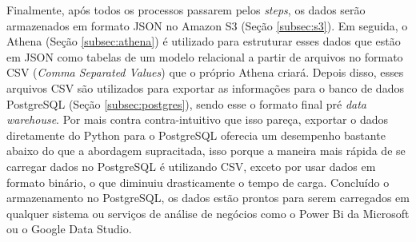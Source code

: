 Finalmente, após todos os processos passarem pelos \textit{steps}, os dados serão armazenados em formato JSON no Amazon S3 (Seção \ref{subsec:s3}). Em seguida, o Athena (Seção \ref{subsec:athena}) é utilizado para estruturar esses dados que estão em JSON como tabelas de um modelo relacional a partir de arquivos no formato CSV (\textit{Comma Separated Values}) que o próprio Athena criará. Depois disso, esses arquivos CSV são utilizados para exportar as informações para o banco de dados PostgreSQL (Seção \ref{subsec:postgres}), sendo esse o formato final pré \textit{data warehouse}. Por mais contra contra-intuitivo que isso pareça, exportar o dados diretamente do Python para o PostgreSQL oferecia um desempenho bastante abaixo do que a abordagem supracitada, isso porque a maneira mais rápida de se carregar dados no PostgreSQL é utilizando CSV, exceto por usar dados em formato binário, o que diminuiu drasticamente o tempo de carga. Concluído o armazenamento no PostgreSQL, os dados estão prontos para serem carregados em qualquer sistema ou serviços de análise de negócios como o Power Bi da Microsoft ou o Google Data Studio.